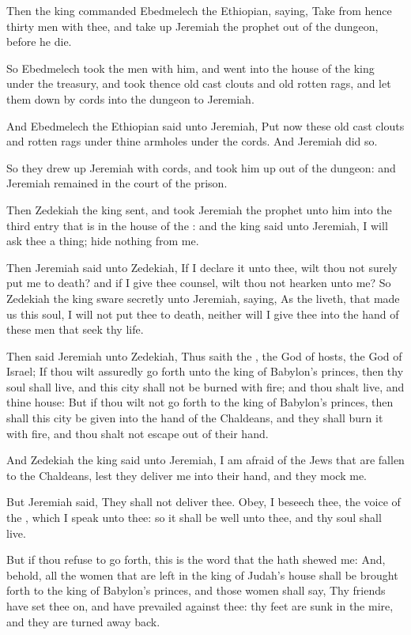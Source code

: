 \Verse Then the king commanded Ebedmelech the Ethiopian, saying, Take from hence thirty men with thee, and take up Jeremiah the prophet out of the dungeon, before he die.

\Verse So Ebedmelech took the men with him, and went into the house of the king under the treasury, and took thence old cast clouts and old rotten rags, and let them down by cords into the dungeon to Jeremiah.

\Verse And Ebedmelech the Ethiopian said unto Jeremiah, Put now these old cast clouts and rotten rags under thine armholes under the cords.  And Jeremiah did so.

\Verse So they drew up Jeremiah with cords, and took him up out of the dungeon: and Jeremiah remained in the court of the prison.

\Verse Then Zedekiah the king sent, and took Jeremiah the prophet unto him into the third entry that is in the house of the \LORD: and the king said unto Jeremiah, I will ask thee a thing; hide nothing from me.

\Verse Then Jeremiah said unto Zedekiah, If I declare it unto thee, wilt thou not surely put me to death? and if I give thee counsel, wilt thou not hearken unto me?  \Verse So Zedekiah the king sware secretly unto Jeremiah, saying, As the \LORD liveth, that made us this soul, I will not put thee to death, neither will I give thee into the hand of these men that seek thy life.

\Verse Then said Jeremiah unto Zedekiah, Thus saith the \LORD, the God of hosts, the God of Israel; If thou wilt assuredly go forth unto the king of Babylon's princes, then thy soul shall live, and this city shall not be burned with fire; and thou shalt live, and thine house: \Verse But if thou wilt not go forth to the king of Babylon's princes, then shall this city be given into the hand of the Chaldeans, and they shall burn it with fire, and thou shalt not escape out of their hand.

\Verse And Zedekiah the king said unto Jeremiah, I am afraid of the Jews that are fallen to the Chaldeans, lest they deliver me into their hand, and they mock me.

\Verse But Jeremiah said, They shall not deliver thee. Obey, I beseech thee, the voice of the \LORD, which I speak unto thee: so it shall be well unto thee, and thy soul shall live.

\Verse But if thou refuse to go forth, this is the word that the \LORD hath shewed me: \Verse And, behold, all the women that are left in the king of Judah's house shall be brought forth to the king of Babylon's princes, and those women shall say, Thy friends have set thee on, and have prevailed against thee: thy feet are sunk in the mire, and they are turned away back.

